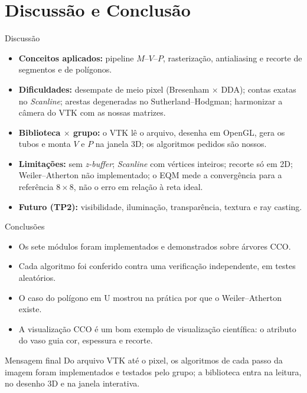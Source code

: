 \documentclass[aspectratio=169,11pt]{beamer}
\begin{document}
\section{Discussão e Conclusão}

\begin{frame}{Discussão}
\small
\begin{itemize}
  \item \textbf{Conceitos aplicados:} pipeline $M$--$V$--$P$, rasterização, antialiasing e recorte de segmentos e de polígonos.
  \item \textbf{Dificuldades:} desempate de meio pixel (Bresenham $\times$ DDA); contas exatas no \emph{Scanline}; arestas degeneradas no Sutherland--Hodgman; harmonizar a câmera do VTK com as nossas matrizes.
  \item \textbf{Biblioteca $\times$ grupo:} o VTK lê o arquivo, desenha em OpenGL, gera os tubos e monta $V$ e $P$ na janela 3D; os algoritmos pedidos são nossos.
  \item \textbf{Limitações:} sem \emph{z-buffer}; \emph{Scanline} com vértices inteiros; recorte só em 2D; Weiler--Atherton não implementado; o EQM mede a convergência para a referência $8\times8$, não o erro em relação à reta ideal.
  \item \textbf{Futuro (TP2):} visibilidade, iluminação, transparência, textura e ray casting.
\end{itemize}
\end{frame}

\begin{frame}{Conclusões}
\begin{itemize}
  \item Os sete módulos foram implementados e demonstrados sobre árvores CCO.
  \item Cada algoritmo foi conferido contra uma verificação independente, em testes aleatórios.
  \item O caso do polígono em U mostrou na prática por que o Weiler--Atherton existe.
  \item A visualização CCO é um bom exemplo de visualização científica: o atributo do vaso guia cor, espessura e recorte.
\end{itemize}

\vspace{0.25cm}

\begin{block}{Mensagem final}
Do arquivo VTK até o pixel, os algoritmos de cada passo da imagem foram implementados e testados pelo grupo; a biblioteca entra na leitura, no desenho 3D e na janela interativa.
\end{block}
\end{frame}
\end{document}
